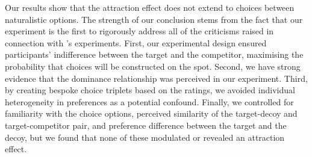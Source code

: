 \documentclass[12pt, a4paper]{article}
\begin{document}
Our results show that the attraction effect does not extend to choices between naturalistic options.  The strength of our conclusion stems from the fact that our experiment is the first to rigorously address all of the criticisms raised in connection with \citeauthor{Frederick2014}'s experiments. First, our experimental design ensured participants' indifference between the target and the competitor, maximising the probability that choices will be constructed on the spot. Second, we have strong evidence that the dominance relationship was perceived in our experiment. Third, by creating bespoke choice triplets based on the ratings, we avoided individual heterogeneity in preferences as a potential confound. Finally, we controlled for familiarity with the choice options, perceived similarity of the target-decoy and target-competitor pair, and preference difference between the target and the decoy, but we found that none of these modulated or revealed an attraction effect.




\newpage



\newpage

\theendnotes

\clearpage
\end{document}
